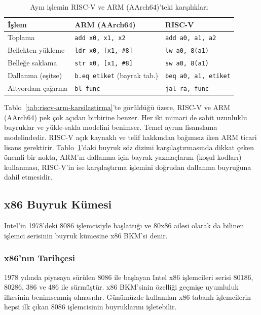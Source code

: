 \begin{table}[H]
\centering
\caption{Aynı işlemin RISC-V ve ARM (AArch64)'teki karşılıkları}
\label{tab:riscv-arm-buyruk}
\small
\begin{tabular}{lll}
\toprule
\textbf{İşlem} & \textbf{ARM (AArch64)} & \textbf{RISC-V} \\
\midrule
Toplama              & \texttt{add x0, x1, x2}           & \texttt{add a0, a1, a2} \\
Bellekten yükleme    & \texttt{ldr x0, [x1, \#8]}        & \texttt{lw a0, 8(a1)} \\
Belleğe saklama      & \texttt{str x0, [x1, \#8]}        & \texttt{sw a0, 8(a1)} \\
Dallanma (eşitse)    & \texttt{b.eq etiket} (bayrak tab.)& \texttt{beq a0, a1, etiket} \\
Altyordam çağırma    & \texttt{bl func}                  & \texttt{jal ra, func} \\
\bottomrule
\end{tabular}
\end{table}

Tablo~\ref{tab:riscv-arm-karsilastirma}'te görüldüğü üzere, RISC-V ve ARM (AArch64) pek çok açıdan birbirine benzer. Her iki mimari de sabit uzunluklu buyruklar ve yükle-sakla modelini benimser. Temel ayrım lisanslama modelindedir. RISC-V açık kaynaklı ve telif hakkından bağımsız iken ARM ticari lisans gerektirir. Tablo~\ref{tab:riscv-arm-buyruk}'daki buyruk söz dizimi karşılaştırmasında dikkat çeken önemli bir nokta, ARM'ın dallanma için bayrak yazmaçlarını (koşul kodları) kullanması, RISC-V'in ise karşılaştırma işlemini doğrudan dallanma buyruğuna dahil etmesidir.


\subsection{x86 Buyruk Kümesi}
\label{sec:x86}

Intel'in 1978'deki 8086 işlemcisiyle başlattığı ve 80x86 ailesi olarak da bilinen işlemci serisinin buyruk kümesine x86 BKM'si denir.

\subsubsection{x86'nın Tarihçesi}

1978 yılında piyasaya sürülen 8086 ile başlayan Intel x86 işlemcileri serisi 80186, 80286, 386 ve 486 ile sürmüştür. x86 BKM'sinin özelliği geçmişe uyumluluk ilkesinin benimsenmiş olmasıdır. Günümüzde kullanılan x86 tabanlı işlemcilerin hepsi ilk çıkan 8086 işlemcisinin buyruklarını işletebilir.

